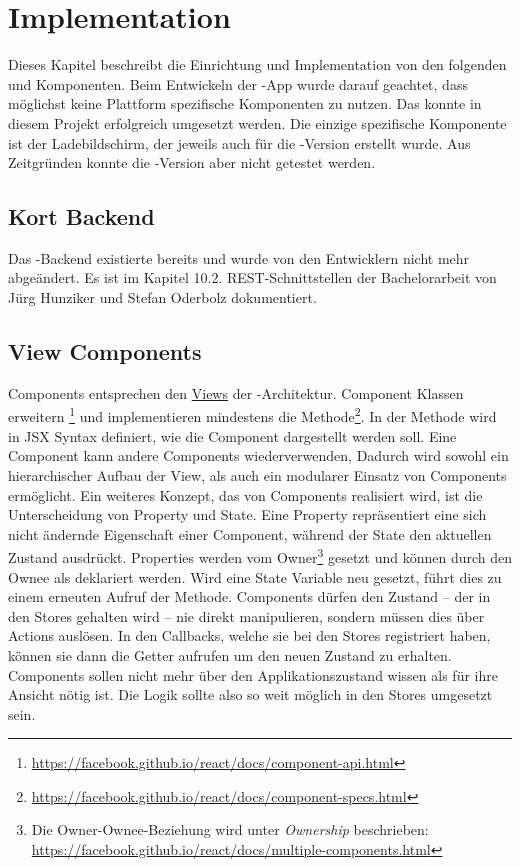 \chapter{Implementation}
\label{pd-implementation}
Dieses Kapitel beschreibt die Einrichtung und Implementation von den folgenden  und Komponenten. 
Beim Entwickeln der -App wurde darauf geachtet, dass möglichst keine Plattform spezifische Komponenten zu nutzen. 
Das konnte in diesem Projekt erfolgreich umgesetzt werden. 
Die einzige spezifische Komponente ist der Ladebildschirm, der jeweils auch für die -Version erstellt wurde.
Aus Zeitgründen konnte die -Version aber nicht getestet werden. 


\section{Kort Backend}
Das \kort{}-Backend existierte bereits und wurde von den Entwicklern nicht mehr abgeändert. 
Es ist im Kapitel 10.2. \gls{REST}-Schnittstellen der Bachelorarbeit von Jürg Hunziker und Stefan Oderbolz dokumentiert.\cite{ba-kort-2012}

\section{View Components}
\label{pd-implementation-components}
Components entsprechen den \hyperref[pd-flux-views]{Views} der -Architektur.
Component Klassen erweitern \footnote{\url{https://facebook.github.io/react/docs/component-api.html}} und implementieren mindestens die  Methode\footnote{\url{https://facebook.github.io/react/docs/component-specs.html}}. 
In der  Methode wird in \gls{JSX} Syntax definiert, wie die Component dargestellt werden soll.\newline
Eine Component kann andere Components wiederverwenden,
Dadurch wird sowohl ein hierarchischer Aufbau der View, als auch ein modularer Einsatz von Components  ermöglicht.\newline
Ein weiteres Konzept, das von Components realisiert wird, ist die Unterscheidung von Property und State.
Eine Property repräsentiert eine sich nicht ändernde Eigenschaft einer Component, während der State den aktuellen Zustand ausdrückt.
Properties werden vom Owner\footnote{Die Owner-Ownee-Beziehung wird unter \emph{Ownership} beschrieben: \url{https://facebook.github.io/react/docs/multiple-components.html}} gesetzt und können durch den Ownee als  deklariert werden.
Wird eine State Variable neu gesetzt, führt dies zu einem erneuten Aufruf der  Methode.\newline
Components dürfen den Zustand -- der in den Stores gehalten wird -- nie direkt manipulieren, sondern müssen dies über Actions auslösen.
In den Callbacks, welche sie bei den Stores registriert haben, können sie dann die Getter aufrufen um den neuen Zustand zu erhalten.
Components sollen nicht mehr über den Applikationszustand wissen als für ihre Ansicht nötig ist.
Die Logik sollte also so weit möglich in den Stores umgesetzt sein.\newline

